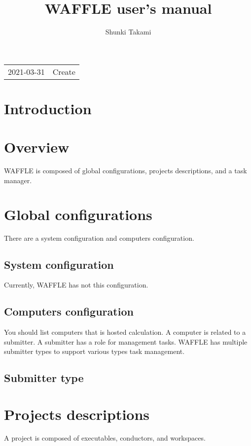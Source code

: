\documentclass[a4paper]{article}
\title{WAFFLE user's manual}
\author{Shunki Takami}
\begin{document}
\maketitle
\thispagestyle{empty}
\begin{table}[]
\begin{tabular}{ll}
2021-03-31 & Create \\
\end{tabular}
\end{table}

\newpage \thispagestyle{empty}
\tableofcontents
\newpage \setcounter{page}{1}

\section{Introduction}

\section{Overview}
WAFFLE is composed of global configurations, projects descriptions, and a task manager.


\section{Global configurations}
There are a system configuration and computers configuration.
\subsection{System configuration}
Currently, WAFFLE has not this configuration.

\subsection{Computers configuration}
You should list computers that is hosted calculation.
A computer is related to a submitter.
A submitter has a role for management tasks.
WAFFLE has multiple submitter types to support various types task management.

\subsection{Submitter type}

\section{Projects descriptions}
A project is composed of executables, conductors, and workspaces.
\end{document}
